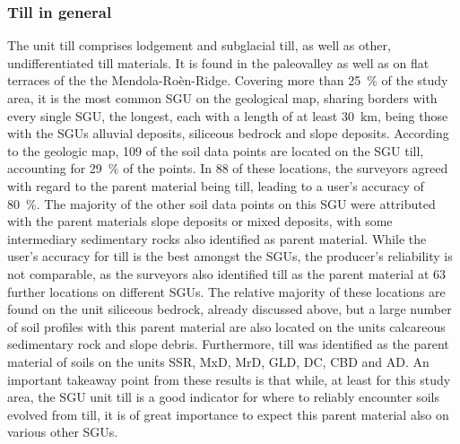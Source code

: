 \documentclass[preprint,12pt,authoryear]{elsarticle}
\begin{document}
\subsubsection{Till in general}
The unit till comprises lodgement and subglacial till, as well as other, undifferentiated till materials. It is found in the paleovalley as well as on flat terraces of the the Mendola-Ro\`en-Ridge.   Covering more than 25~\% of the study area, it is the most common SGU on the geological map, sharing borders with every single SGU, the longest, each with a length of at least 30~km, being those with the SGUs alluvial deposits,  siliceous bedrock and slope deposits. According to the geologic map, 109 of the soil data points are located on the SGU till, accounting for 29~\% of the points. In 88 of these locations, the surveyors agreed with regard to the parent material being till, leading to a user's accuracy of 80~\%. The majority of the other soil data points on this SGU were attributed with the parent materials slope deposits or  mixed deposits, with some intermediary sedimentary rocks also identified as parent material. While the user's accuracy for till is the best amongst the SGUs, the producer's reliability is not comparable, as the surveyors also identified till as the parent material at 63 further locations on different SGUs. The relative majority of these locations are found on the unit siliceous bedrock, already discussed above, but a large number of soil profiles with this parent material are also located on the units calcareous sedimentary rock and slope debris. Furthermore, till was identified as the parent material of soils on the units SSR, MxD, MrD, GLD, DC, CBD and AD. An important takeaway point from these results is that while, at least for this study area, the SGU unit till is a good indicator for where to reliably encounter soils evolved from till, it is of great importance to expect this  parent material also on various other SGUs.
\end{document}
